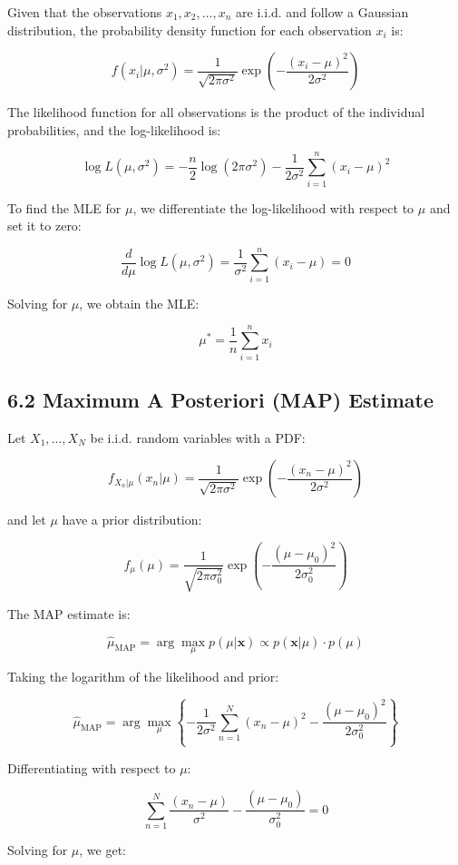 \documentclass{article}
\begin{document}
Given that the observations \(x_1, x_2, \dots, x_n\) are i.i.d. and follow a Gaussian distribution, the probability density function for each observation \(x_i\) is:

\[
f(x_i|\mu, \sigma^2) = \frac{1}{\sqrt{2\pi\sigma^2}} \exp\left( -\frac{(x_i - \mu)^2}{2\sigma^2} \right)
\]

The likelihood function for all observations is the product of the individual probabilities, and the log-likelihood is:

\[
\log L(\mu, \sigma^2) = -\frac{n}{2} \log(2\pi\sigma^2) - \frac{1}{2\sigma^2} \sum_{i=1}^{n} (x_i - \mu)^2
\]

To find the MLE for \(\mu\), we differentiate the log-likelihood with respect to \(\mu\) and set it to zero:

\[
\frac{d}{d\mu} \log L(\mu, \sigma^2) = \frac{1}{\sigma^2} \sum_{i=1}^{n} (x_i - \mu) = 0
\]

Solving for \(\mu\), we obtain the MLE:

\[
\mu^* = \frac{1}{n} \sum_{i=1}^{n} x_i
\]

\subsection*{6.2 Maximum A Posteriori (MAP) Estimate}

Let \( X_1, \dots, X_N \) be i.i.d. random variables with a PDF:

\[
f_{X_n|\mu}(x_n|\mu) = \frac{1}{\sqrt{2\pi\sigma^2}} \exp\left( -\frac{(x_n - \mu)^2}{2\sigma^2} \right)
\]

and let \(\mu\) have a prior distribution:

\[
f_\mu(\mu) = \frac{1}{\sqrt{2\pi\sigma_0^2}} \exp\left( -\frac{(\mu - \mu_0)^2}{2\sigma_0^2} \right)
\]

The MAP estimate is:

\[
\hat{\mu}_{\text{MAP}} = \arg\max_\mu p(\mu|\mathbf{x}) \propto p(\mathbf{x}|\mu) \cdot p(\mu)
\]

Taking the logarithm of the likelihood and prior:

\[
\hat{\mu}_{\text{MAP}} = \arg\max_\mu \left\{ -\frac{1}{2\sigma^2} \sum_{n=1}^N (x_n - \mu)^2 - \frac{(\mu - \mu_0)^2}{2\sigma_0^2} \right\}
\]

Differentiating with respect to \(\mu\):

\[
\sum_{n=1}^N \frac{(x_n - \mu)}{\sigma^2} - \frac{(\mu - \mu_0)}{\sigma_0^2} = 0
\]

Solving for \(\mu\), we get:
\end{document}
